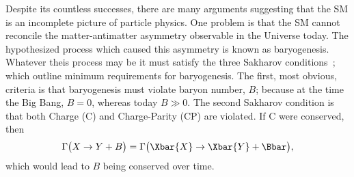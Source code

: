 Despite its countless successes,
there are many arguments suggesting that the SM is an incomplete
picture of particle physics.
One problem is that the SM cannot reconcile the matter-antimatter asymmetry observable in the
Universe today.
The hypothesized process which caused this asymmetry is known as baryogenesis.
Whatever theis process may be it must satisfy the three Sakharov
conditions~\cite{1991SvPhU..34..392S}; which outline minimum requirements for baryogenesis.
The first, most obvious, criteria is that baryogenesis must violate baryon number, $B$; because at
the time the Big Bang, $B=0$, whereas today $B\gg0$.
The second Sakharov condition is that both Charge (C) and Charge-Parity (CP) are violated.
If C were conserved, then
\begin{equation}
  \Gamma\big(X\to Y+B\big)=\Gamma\big(\Xbar{X} \to \Xbar{Y}+\Bbar\big),
\end{equation}
which would lead to $B$ being conserved over time.
